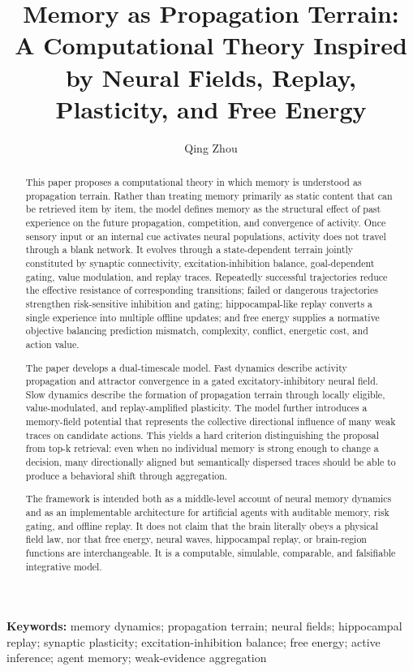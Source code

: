 \documentclass[11pt, a4paper]{article}
\title{\textbf{Memory as Propagation Terrain: \\ A Computational Theory Inspired by Neural Fields, Replay, Plasticity, and Free Energy}}
\author{Qing Zhou}\date{}
\begin{document}
\maketitle

\begin{abstract}

This paper proposes a computational theory in which memory is understood as propagation terrain. Rather than treating memory primarily as static content that can be retrieved item by item, the model defines memory as the structural effect of past experience on the future propagation, competition, and convergence of activity. Once sensory input or an internal cue activates neural populations, activity does not travel through a blank network. It evolves through a state-dependent terrain jointly constituted by synaptic connectivity, excitation-inhibition balance, goal-dependent gating, value modulation, and replay traces. Repeatedly successful trajectories reduce the effective resistance of corresponding transitions; failed or dangerous trajectories strengthen risk-sensitive inhibition and gating; hippocampal-like replay converts a single experience into multiple offline updates; and free energy supplies a normative objective balancing prediction mismatch, complexity, conflict, energetic cost, and action value.

The paper develops a dual-timescale model. Fast dynamics describe activity propagation and attractor convergence in a gated excitatory-inhibitory neural field. Slow dynamics describe the formation of propagation terrain through locally eligible, value-modulated, and replay-amplified plasticity. The model further introduces a memory-field potential that represents the collective directional influence of many weak traces on candidate actions. This yields a hard criterion distinguishing the proposal from top-k retrieval: even when no individual memory is strong enough to change a decision, many directionally aligned but semantically dispersed traces should be able to produce a behavioral shift through aggregation.

The framework is intended both as a middle-level account of neural memory dynamics and as an implementable architecture for artificial agents with auditable memory, risk gating, and offline replay. It does not claim that the brain literally obeys a physical field law, nor that free energy, neural waves, hippocampal replay, or brain-region functions are interchangeable. It is a computable, simulable, comparable, and falsifiable integrative model.

\end{abstract}
\textbf{Keywords:} memory dynamics; propagation terrain; neural fields; hippocampal replay; synaptic plasticity; excitation-inhibition balance; free energy; active inference; agent memory; weak-evidence aggregation
\end{document}
